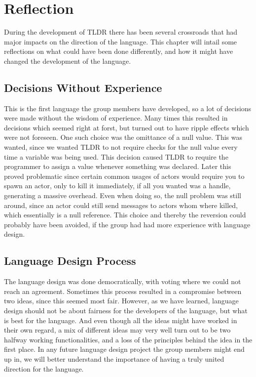 \chapter{Reflection}\label{chapter:reflection}

During the development of TLDR there has been several crossroads that had major impacts on the direction of the language. This chapter will intail some reflections on what could have been done differently, and how it might have changed the development of the language.

\section{Decisions Without Experience}

This is the first language the group members have developed, so a lot of decisions were made without the wisdom of experience. Many times this resulted in decisions which seemed right at forst, but turned out to have ripple effects which were not foreseen. One such choice was the omittance of a null value. This was wanted, since we wanted TLDR to not require checks for the null value every time a variable was being used. This decision caused TLDR to require the programmer to assign a value whenever something was declared. Later this proved problematic since certain common usages of actors would require you to spawn an actor, only to kill it immediately, if all you wanted was a handle, generating a massive overhead. Even when doing so, the null problem was still around, since an actor could still send messages to actors whom where killed, which essentially is a null reference. This choice and thereby the reversion could probably have been avoided, if the group had had more experience with language design.

\section{Language Design Process}

The language design was done democratically, with voting where we could not reach an agreement. Sometimes this process resulted in a compromise between two ideas, since this seemed most fair. However, as we have learned, language design should not be about fairness for the developers of the language, but what is best for the language. And even though all the ideas might have worked in their own regard, a mix of different ideas may very well turn out to be two halfway working functionalities, and a loss of the principles behind the idea in the first place. In any future language design project the group members might end up in, we will better understand the importance of having a truly united direction for the language.

